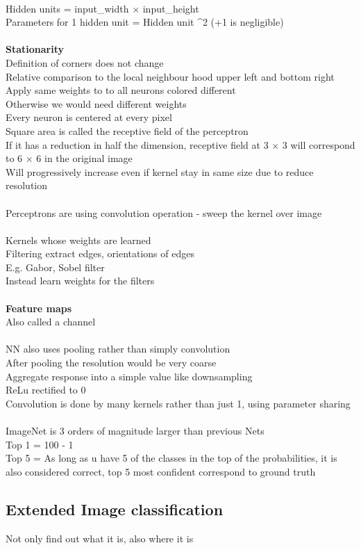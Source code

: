 \documentclass[11pt]{article}
\begin{document}
\\
Hidden units = input\_width $\times$ input\_height
\\
Parameters for 1 hidden unit = Hidden unit ^2\) (+1 is negligible)
\\\)\\
\textbf{Stationarity}\\
Definition of corners does not change\\
Relative comparison to the local neighbour hood upper left and bottom right\\
Apply same weights to to all neurons colored different
\\
Otherwise we would need different weights\\
Every neuron is centered at every pixel\\
Square area is called the receptive field of the perceptron\\
If it has a reduction in half the dimension, receptive field at 3 $\times$ 3 will correspond to 6 $\times$ 6 in the original image\\
Will progressively increase even if kernel stay in same size due to reduce resolution
\\\\
Perceptrons are using convolution operation - sweep the kernel over image 
\\
\\
Kernels whose weights are learned\\
Filtering extract edges, orientations of edges
\\
E.g. Gabor, Sobel filter
\\
Instead learn weights for the filters
\\\\
\textbf{Feature maps}\\
Also called a channel\\
\\
NN also uses pooling rather than simply convolution
\\
After pooling the resolution would be very coarse\\
Aggregate response into a simple value like downsampling
\\
ReLu rectified to 0
\\
Convolution is done by many kernels rather than just 1, using parameter sharing
\\
\\
ImageNet is 3 orders of magnitude larger than previous Nets
\\
Top 1 = 100 - 1\\
Top 5 = As long as u have 5 of the classes in the top of the probabilities, it is also considered correct, top 5 most confident correspond to ground truth
\\
\subsection*{Extended Image classification}
Not only find out what it is, also where it is
\end{document}
